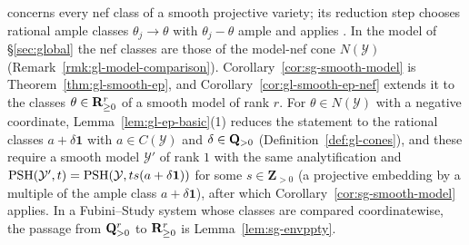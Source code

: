 \begin{remark}\label{rmk:sg-nef}
\cite[Theorem~3.1]{FHX} concerns every nef class of a smooth projective variety; its reduction step chooses rational ample classes $\theta_j\to\theta$
with $\theta_j-\theta$ ample and applies \cite[Lemma~5.9]{BJ22}. In the model of \S\ref{sec:global} the nef classes are those of the model-nef cone
$N(\mathcal Y)$ (Remark~\ref{rmk:gl-model-comparison}). Corollary~\ref{cor:sg-smooth-model} is Theorem~\ref{thm:gl-smooth-ep}, and
Corollary~\ref{cor:gl-smooth-ep-nef} extends it to the classes $\theta\in\mathbf{R}^r_{\ge0}$ of a smooth model of rank $r$. For $\theta\in N(\mathcal Y)$ with a
negative coordinate, Lemma~\ref{lem:gl-ep-basic}(1) reduces the statement to the rational classes $a+\delta\mathbf 1$ with $a\in C(\mathcal Y)$ and
$\delta\in\mathbf{Q}_{>0}$ (Definition~\ref{def:gl-cones}), and these require a smooth model $\mathcal Y'$ of rank $1$ with the same analytification and
$\operatorname{PSH}(\mathcal Y',t)=\operatorname{PSH}(\mathcal Y,ts(a+\delta\mathbf 1))$ for some $s\in\mathbf Z_{>0}$ (a projective embedding by a multiple of the ample class
$a+\delta\mathbf1$), after which Corollary~\ref{cor:sg-smooth-model} applies. In a Fubini--Study system whose classes are compared coordinatewise,
the passage from $\mathbf{Q}^r_{>0}$ to $\mathbf{R}^r_{\ge0}$ is Lemma~\ref{lem:sg-envppty}.
\end{remark}

